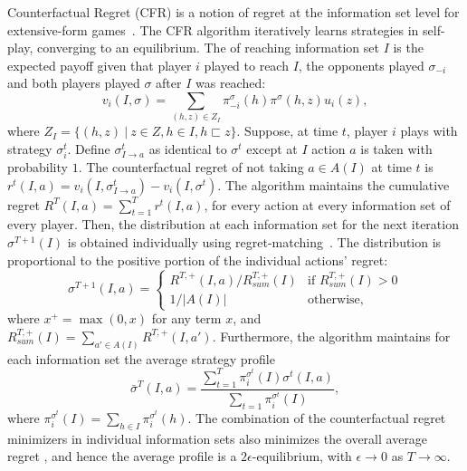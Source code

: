 \documentclass[letterpaper]{article}
\newcommand{\defword}[1]{\textbf{\boldmath{#1}}}
\begin{document}
Counterfactual Regret (CFR) is a notion of regret at the information set level for extensive-form games~\cite{CFR}. 
The CFR algorithm iteratively learns strategies in self-play, converging to an equilibrium. 
The \defword{counterfactual value} of reaching information set $I$ is the expected payoff given that player $i$ played to reach $I$, the opponents played 
$\sigma_{-i}$ and both players played $\sigma$ after $I$ was reached:
\begin{equation}
\label{eq:cfv}
v_i(I,\sigma) = \sum_{(h,z) \in Z_I} \pi^{\sigma}_{-i}(h) \pi^{\sigma}(h,z) u_i(z), 
\end{equation}
where $Z_I = \{ (h,z)~|~z \in Z, h \in I, h \sqsubset z \}$.
Suppose, at time $t$, player $i$ plays with strategy $\sigma^t_i$. 
Define $\sigma^t_{I \rightarrow a}$ as identical to $\sigma^t$ except at $I$ action $a$ is taken with probability $1$. 
The counterfactual regret of not taking $a \in A(I)$ at time $t$ is $r^t(I,a) = v_i(I,\sigma^t_{I \rightarrow a}) - v_i(I,\sigma^t)$. 
The algorithm maintains the cumulative regret $R^T(I,a) = \sum_{t=1}^T r^t(I,a)$, for every action at every information set of every player. 
Then, the distribution at each information set for the next iteration $\sigma^{T+1}(I)$ is obtained individually using 
regret-matching~\cite{Hart00}. The distribution is proportional to the positive portion of the individual actions' regret:
\begin{equation*}
\label{eq:rm}
\sigma^{T+1}(I,a) = \left\{
\begin{array}{ll}
R^{T,+}(I,a) / R^{T,+}_{sum}(I) & \mbox{if } R^{T,+}_{sum}(I) > 0 \\ 
1 / |A(I)|                   & \mbox{otherwise,}
\end{array} \right.
\end{equation*}
where $x^+ = \max(0,x)$ for any term $x$, and $R^{T,+}_{sum}(I) = \sum_{a' \in A(I)} R^{T,+}(I,a')$. Furthermore, the algorithm maintains for each information set the average strategy profile
\begin{equation}
\bar{\sigma}^T(I,a) = \frac{\sum_{t=1}^T \pi^{\sigma^t}_i(I) \sigma^t(I,a)}{\sum_{t=1} \pi^{\sigma^t}_i(I)}, 
\end{equation}
where $\pi^{\sigma^t}_i(I) = \sum_{h \in I}\pi^{\sigma^t}_i(h)$.
The combination of the counterfactual regret minimizers in individual information sets also minimizes the overall average regret \cite{CFR}, and hence the average profile is a $2\epsilon$-equilibrium, with $\epsilon \rightarrow 0$
as $T \rightarrow \infty$.
\end{document}
